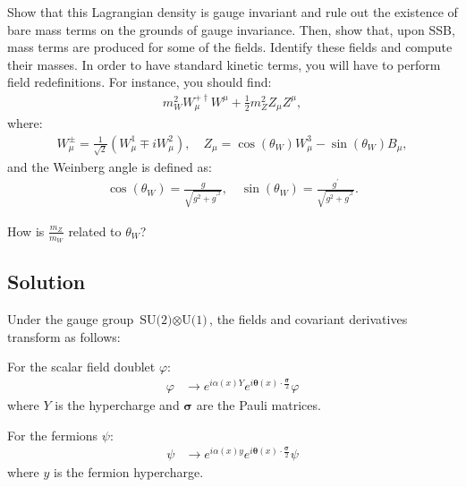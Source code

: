 Show that this Lagrangian density is gauge invariant and rule out the existence of bare mass terms on the grounds of gauge invariance. Then, show that, upon SSB, mass terms are produced for some of the fields. Identify these fields and compute their masses. In order to have standard kinetic terms, you will have to perform field redefinitions. For instance, you should find:
\begin{align}
    m_W^2 W^{+\dagger}_\mu W^\mu + \frac{1}{2} m_Z^2 Z_\mu Z^\mu,
\end{align}
where:
\begin{align}
    W_\mu^\pm = \frac{1}{\sqrt{2}} (W_\mu^1 \mp i W_\mu^2), \quad Z_\mu = \cos(\theta_W) W_\mu^3 - \sin(\theta_W) B_\mu,
\end{align}
and the Weinberg angle is defined as:
\begin{align}
    \cos(\theta_W) = \frac{g}{\sqrt{g^2 + g^\prime ^2}}, \quad \sin(\theta_W) = \frac{g^\prime }{\sqrt{g^2 + g^\prime ^2}}.
\end{align}

How is $\displaystyle\frac{m_Z}{m_W}$ related to $\theta_W$?
\bigskip\bigskip\hline\hline\bigskip
\subsection*{Solution}
Under the gauge group $\text{SU(2)} \otimes \text{U(1)}$, the fields and covariant derivatives transform as follows:

For the scalar field doublet $\varphi$:
\begin{align}
    \varphi &\to e^{\displaystyle i \alpha(x) Y} e^{\displaystyle i \boldsymbol{\theta}(x) \cdot \frac{\boldsymbol{\sigma}}{2}} \varphi
\end{align}
where $Y$ is the hypercharge and $\boldsymbol{\sigma}$ are the Pauli matrices.

For the fermions $\psi$:
\begin{align}
    \psi &\to e^{\displaystyle i \alpha(x) y} e^{\displaystyle i \boldsymbol{\theta}(x) \cdot \frac{\boldsymbol{\sigma}}{2}} \psi
\end{align}
where $y$ is the fermion hypercharge.


